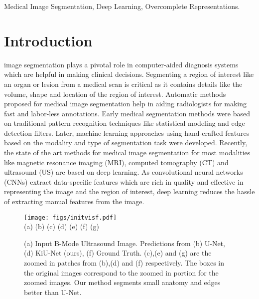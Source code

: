 \documentclass[journal,twoside,web]{ieeecolor}
\begin{document}
\begin{IEEEkeywords}
 Medical Image Segmentation, Deep Learning, Overcomplete Representations.

\end{IEEEkeywords}

\section{Introduction}
\label{sec:introduction}
 image segmentation plays a pivotal role in computer-aided diagnosis systems which are helpful in making clinical decisions. Segmenting a region of interest like an organ or lesion from a medical scan is critical as it contains details like the volume, shape and location of the region of interest. Automatic methods proposed for medical image segmentation help in aiding radiologists for making fast and labor-less annotations. Early medical segmentation methods were based on traditional pattern recognition techniques like statistical modeling and edge detection filters. Later, machine learning approaches using hand-crafted features based on the modality and type of segmentation task were developed. Recently, the state of the art methods for medical image segmentation for most modalities like magnetic resonance imaging (MRI), computed tomography (CT) and ultrasound (US) are based on deep learning. As convolutional neural networks (CNNs) extract data-specific features which are rich in quality and effective in representing the image and the region of interest, deep learning reduces the hassle of extracting manual features from the image.  


\begin{figure*}[htp!]
	\centering
	\texttt{[image: figs/initvisf.pdf]}\\
	(a) \hskip50pt (b) \hskip50pt (c) \hskip50pt (d) \hskip50pt (e) \hskip50pt (f) \hskip50pt (g) \hskip50pt  \\
	\caption{ (a) Input B-Mode Ultrasound Image. Predictions from (b) U-Net, (d) KiU-Net
		(ours), (f) Ground Truth. (c),(e) and (g) are the zoomed in patches from (b),(d) and
		(f) respectively. The boxes in the original images correspond to the zoomed in portion
		for the zoomed images. Our method segments small anatomy and edges better than U-Net.}
	
	\label{initvis}
\end{figure*}
\end{document}
